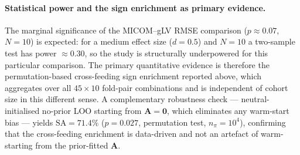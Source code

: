 \paragraph{Statistical power and the sign enrichment as primary evidence.}
The marginal significance of the MICOM--gLV RMSE comparison ($p\approx0.07$,
$N=10$) is expected: for a medium effect size ($d=0.5$) and $N=10$ a
two-sample test has power $\approx0.30$, so the study is structurally
underpowered for this particular comparison. The primary quantitative
evidence is therefore the permutation-based cross-feeding sign enrichment
reported above, which aggregates over all $45\times10$ fold-pair combinations
and is independent of cohort size in this different sense. A complementary
robustness check --- neutral-initialised no-prior LOO starting from
$\mathbf{A}=\mathbf{0}$, which eliminates any warm-start bias --- yields
$\mathrm{SA}=71.4\%$ ($p=0.027$, permutation test, $n_\pi=10^4$), confirming
that the cross-feeding enrichment is data-driven and not an artefact of
warm-starting from the prior-fitted $\mathbf{A}$.
